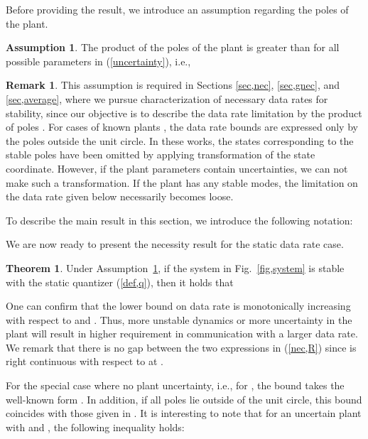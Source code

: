 \documentclass[a4paper, 11pt]{article}
\theoremstyle{definition}
\newtheorem{thm}{Theorem}
\newtheorem{assum}{Assumption}
\newtheorem{rem}{Remark}
\newcommand{\fref}[1]{Fig.~\ref{#1}}
\begin{document}
Before providing the result, we introduce an assumption regarding
the poles of the plant.
\begin{assum}\label{asm,instability}
The product of the poles of the plant is greater than  for all
possible parameters in (\ref{uncertainty}), i.e.,

\end{assum}

\begin{rem}
This assumption is required in Sections \ref{sec,nec}, \ref{sec,gnec}, and \ref{sec,average},
where we pursue characterization of necessary data rates for stability,
since our objective is to describe the data rate limitation by the product of poles
.
For cases of known plants \cite{Nair2004, Tatikonda2004, Tatikonda2004a}, the data rate bounds are expressed only by the poles outside the unit circle.
In these works, the states corresponding to the stable poles
have been omitted by applying transformation of the state coordinate.
However, if the plant parameters contain uncertainties, we can not make
such a transformation.
If the plant has any stable modes, the limitation on the data rate
given below necessarily becomes loose.
\end{rem}


To describe the main result in this section, we introduce the following notation:


We are now ready to present the necessity result for the static data rate case.
\begin{thm}\label{th,nec}
 Under Assumption~\ref{asm,instability}, if the system in \fref{fig,system}
is stable with the static quantizer (\ref{def,q}), then it holds that

\end{thm}

One can confirm that the lower bound  on data rate is monotonically
increasing with respect to  and .
Thus, more unstable dynamics or more uncertainty in the plant will result
in higher requirement in communication with a larger data rate.
We remark that there is no gap between the two expressions in (\ref{nec,R})
since  is right continuous with respect to  at .

For the special case where no plant uncertainty, i.e.,  for
, the bound  takes the well-known form .
In addition, if all poles lie outside of the unit circle, this bound coincides
with those given in \cite{Tatikonda2004, Nair2004}.
It is interesting to note that for an uncertain plant with 
and , the following inequality holds:
\end{document}
